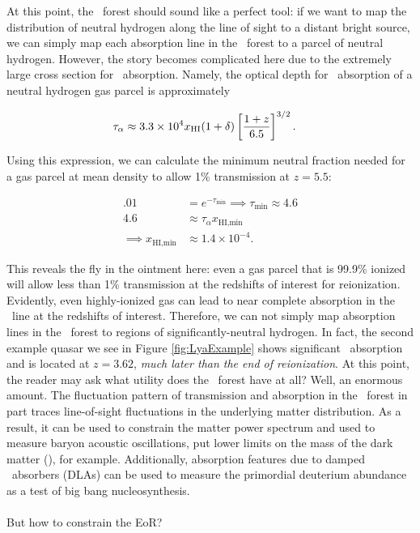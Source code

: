 At this point, the \lya\ forest should sound like a perfect tool: if we want to map the distribution of neutral hydrogen along the line of sight to a distant bright source, we can simply map each absorption line in the \lya\ forest to a parcel of neutral hydrogen. However, the story becomes complicated here due to the extremely large cross section for \lya\ absorption. Namely, the optical depth for \lya\ absorption of a neutral hydrogen gas parcel is approximately

\begin{align}
\tau_{\alpha} &\approx 3.3 \times 10^{4} x_{\text{HI}} (1 + \delta) \left[\dfrac{1+z}{6.5}\right]^{3/2}. \label{eq:tauGP}
\end{align}

Using this expression, we can calculate the minimum neutral fraction needed for a gas parcel at mean density to allow 1\% transmission at $z = 5.5$:

\begin{align}
.01 &= e^{-\tau_{\text{min}}} \implies \tau_{\text{min}} \approx 4.6\\
4.6 &\approx \tau_{\alpha} x_{\text{HI,min}} \\
\implies x_{\text{HI,min}} &\approx 1.4 \times 10^{-4}.
\end{align}


This reveals the fly in the ointment here: even a gas parcel that is 99.9\% ionized will allow less than 1\% transmission at the redshifts of interest for reionization. Evidently, even highly-ionized gas can lead to near complete absorption in the \lya\ line at the redshifts of interest. Therefore, we can not simply map absorption lines in the \lya\ forest to regions of significantly-neutral hydrogen. In fact, the second example quasar we see in Figure \ref{fig:LyaExample} shows significant \lya\ absorption and is located at $z = 3.62$, \textit{much later than the end of reionization}. At this point, the reader may ask what utility does the \lya\ forest have at all? Well, an enormous amount. The fluctuation pattern of transmission and absorption in the \lya\ forest in part traces line-of-sight fluctuations in the underlying matter distribution. As a result, it can be used to constrain the matter power spectrum and used to measure baryon acoustic oscillations, put lower limits on the mass of the dark matter (\citealt{Viel:2013fqw}), for example. Additionally, absorption features due to damped \lya\ absorbers (DLAs) can be used to measure the primordial deuterium abundance as a test of big bang nucleosynthesis.\\
\textcolor{white}{suspense!}\\
\noindent But how to constrain the EoR?


